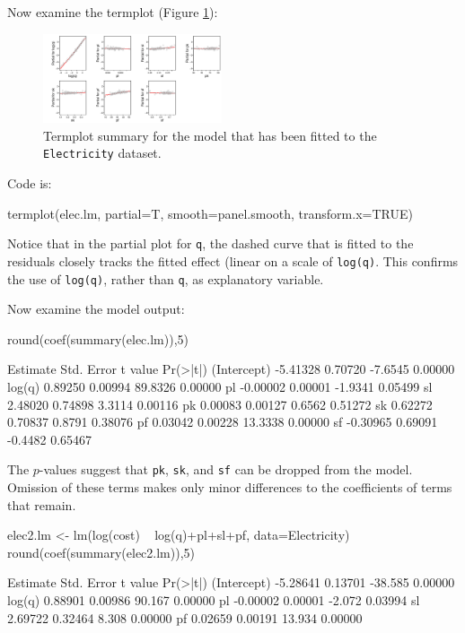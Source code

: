 \documentclass{tufte-book}\usepackage[]{graphicx}\usepackage[]{color}
\newcommand{\txtt}[1]{\texttt{#1}}
\begin{document}
Now examine the termplot (Figure \ref{fig:elec-log-tplot}):
\begin{figure}[h]
\begin{Schunk}


\centerline{\includegraphics[width=0.47\textwidth]{figs/11-elec-me-tplot-1} }

\end{Schunk}
\caption{Termplot summary for the model that has been fitted to the
  \texttt{Electricity} dataset.\label{fig:elec-log-tplot}}
\end{figure}
\noindent Code is:
\begin{Schunk}
\begin{Sinput}
termplot(elec.lm, partial=T, smooth=panel.smooth,
         transform.x=TRUE)
\end{Sinput}
\end{Schunk}
Notice that in the partial plot for \txtt{q}, the dashed curve that is
fitted to the residuals closely tracks the fitted effect (linear on a
scale of \txtt{log(q)}.  This confirms the use of \txtt{log(q)},
rather than \txtt{q}, as explanatory variable.

Now examine the model output:
\begin{Schunk}
\begin{Sinput}
round(coef(summary(elec.lm)),5)
\end{Sinput}
\begin{Soutput}
            Estimate Std. Error t value Pr(>|t|)
(Intercept) -5.41328    0.70720 -7.6545  0.00000
log(q)       0.89250    0.00994 89.8326  0.00000
pl          -0.00002    0.00001 -1.9341  0.05499
sl           2.48020    0.74898  3.3114  0.00116
pk           0.00083    0.00127  0.6562  0.51272
sk           0.62272    0.70837  0.8791  0.38076
pf           0.03042    0.00228 13.3338  0.00000
sf          -0.30965    0.69091 -0.4482  0.65467
\end{Soutput}
\end{Schunk}

The $p$-values suggest that \texttt{pk}, \texttt{sk}, and \texttt{sf}
can be dropped from the model. Omission of these terms makes only
minor differences to the coefficients of terms that remain.
\begin{Schunk}
\begin{Sinput}
elec2.lm <- lm(log(cost) ~ log(q)+pl+sl+pf,
               data=Electricity)
round(coef(summary(elec2.lm)),5)
\end{Sinput}
\begin{Soutput}
            Estimate Std. Error t value Pr(>|t|)
(Intercept) -5.28641    0.13701 -38.585  0.00000
log(q)       0.88901    0.00986  90.167  0.00000
pl          -0.00002    0.00001  -2.072  0.03994
sl           2.69722    0.32464   8.308  0.00000
pf           0.02659    0.00191  13.934  0.00000
\end{Soutput}
\end{Schunk}
\end{document}
